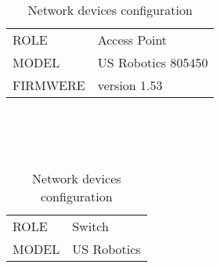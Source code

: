 	\begin{table}[h]
		
		\begin{tabularx}{15cm}{ | m{4cm} X | }
			\hline
				ROLE & Access Point\\
				MODEL & US Robotics 805450\\
				FIRMWERE & version 1.53\\
			\hline
		\end{tabularx}
		\\\\\\
		\begin{tabularx}{15cm}{ | m{4cm} X | }
			\hline
				ROLE & Switch\\
				MODEL & US Robotics\\
			\hline
		\end{tabularx}
		
		\caption{Network devices configuration}
		\label{table2}
		\label{tbl:networkdevices}
	\end{table}

